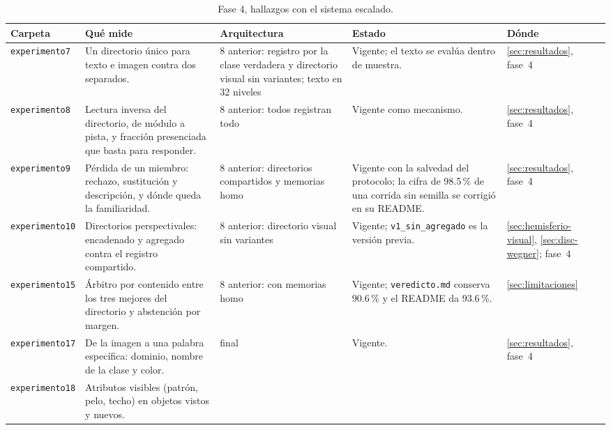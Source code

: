 \begin{table}[H]
\centering
\caption[Fase 4, hallazgos con el sistema escalado]{Fase 4, hallazgos con el sistema escalado.}
\label{tab:fase4-experimentos}
\footnotesize
\setlength{\tabcolsep}{3pt}
\begin{tabular}{p{3.1cm}p{4.7cm}p{2.0cm}p{3.1cm}p{1.6cm}}
\toprule
Carpeta & Qué mide & Arquitectura & Estado & Dónde \tabularnewline
\midrule
\raggedright \texttt{experimento7} &
\raggedright Un directorio único para texto e imagen contra dos separados. &
\raggedright 8 anterior: registro por la clase verdadera y directorio visual sin variantes; texto en 32 niveles &
\raggedright Vigente; el texto se evalúa dentro de muestra. &
\raggedright \ref{sec:resultados}, fase~4 \tabularnewline\addlinespace[4pt]
\raggedright \texttt{experimento8} &
\raggedright Lectura inversa del directorio, de módulo a pista, y fracción presenciada que basta para responder. &
\raggedright 8 anterior: todos registran todo &
\raggedright Vigente como mecanismo. &
\raggedright \ref{sec:resultados}, fase~4 \tabularnewline\addlinespace[4pt]
\raggedright \texttt{experimento9} &
\raggedright Pérdida de un miembro: rechazo, sustitución y descripción, y dónde queda la familiaridad. &
\raggedright 8 anterior: directorios compartidos y memorias homo &
\raggedright Vigente con la salvedad del protocolo; la cifra de 98.5\,\% de una corrida sin semilla se corrigió en su README. &
\raggedright \ref{sec:resultados}, fase~4 \tabularnewline\addlinespace[4pt]
\raggedright \texttt{experimento10} &
\raggedright Directorios perspectivales: encadenado y agregado contra el registro compartido. &
\raggedright 8 anterior: directorio visual sin variantes &
\raggedright Vigente; \texttt{v1\_\allowbreak sin\_\allowbreak agregado} es la versión previa. &
\raggedright \ref{sec:hemisferio-visual}, \ref{sec:disc-wegner}; fase~4 \tabularnewline\addlinespace[4pt]
\raggedright \texttt{experimento15} &
\raggedright Árbitro por contenido entre los tres mejores del directorio y abstención por margen. &
\raggedright 8 anterior: con memorias homo &
\raggedright Vigente; \texttt{veredicto.md} conserva 90.6\,\% y el README da 93.6\,\%. &
\raggedright \ref{sec:limitaciones} \tabularnewline\addlinespace[4pt]
\raggedright \texttt{experimento17} &
\raggedright De la imagen a una palabra específica: dominio, nombre de la clase y color. &
\raggedright final &
\raggedright Vigente. &
\raggedright \ref{sec:resultados}, fase~4 \tabularnewline\addlinespace[4pt]
\raggedright \texttt{experimento18} &
\raggedright Atributos visibles (patrón, pelo, techo) en objetos vistos y nuevos. &

\end{tabular}
\end{table}
